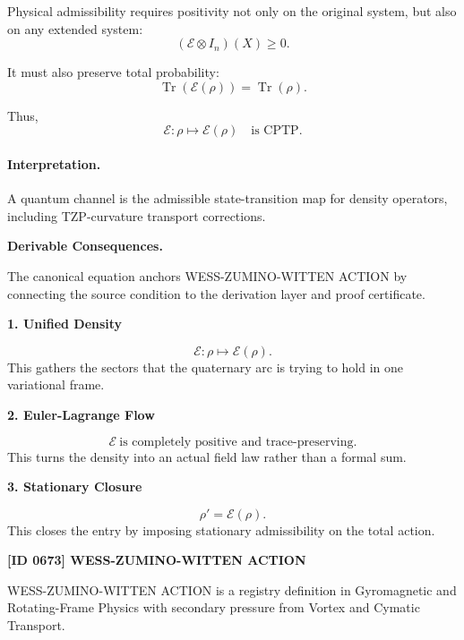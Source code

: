 Physical admissibility requires positivity not only on the original system, but also on any extended system:
\begin{equation}
(\mathcal{E}\otimes I_n)(X)\geq 0 .
\end{equation}

It must also preserve total probability:
\begin{equation}
\operatorname{Tr}(\mathcal{E}(\rho))=\operatorname{Tr}(\rho).
\end{equation}

Thus,
\begin{equation}
\boxed{
\mathcal{E}:\rho\mapsto\mathcal{E}(\rho)
\quad
\text{is CPTP}.
}
\end{equation}

\paragraph{Interpretation.}
A quantum channel is the admissible state-transition map for density operators, including TZP-curvature transport corrections.

\par\vspace{0.35em}
\noindent\textbf{Derivable Consequences.}\quad
\begingroup
\footnotesize
\raggedright
The canonical equation anchors WESS-ZUMINO-WITTEN ACTION by connecting the source condition to the derivation layer and proof certificate.
\par\endgroup

\noindent\textbf{1. Unified Density}\par
\[
\mathcal{E}:\rho\mapsto \mathcal{E}(\rho).
\]
\noindent This gathers the sectors that the quaternary arc is trying to hold in one variational frame.\par
\noindent\textbf{2. Euler-Lagrange Flow}\par
\[
\mathcal{E}\ \text{is completely positive and trace-preserving}.
\]
\noindent This turns the density into an actual field law rather than a formal sum.\par
\noindent\textbf{3. Stationary Closure}\par
\[
\rho'=\mathcal{E}(\rho).
\]
\noindent This closes the entry by imposing stationary admissibility on the total action.\par

\clearpage
\noindent\textbf{[ID 0673] WESS-ZUMINO-WITTEN ACTION}\par
\vspace{0.35em}
\begingroup\small
{}
WESS-ZUMINO-WITTEN ACTION is a registry definition in Gyromagnetic and Rotating-Frame Physics with secondary pressure from Vortex and Cymatic Transport.

